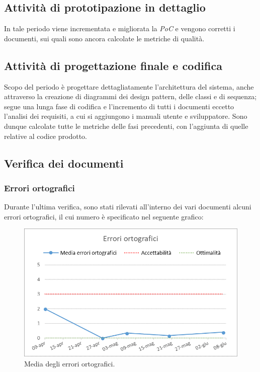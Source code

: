 \subsection{Attività di prototipazione in dettaglio}
In tale periodo viene incrementata e migliorata la \emph{PoC} e vengono corretti i documenti, sui quali sono ancora calcolate le metriche di qualità.

\subsection{Attività di progettazione finale e codifica}
Scopo del periodo è progettare dettagliatamente l'architettura del sistema, anche attraverso la creazione di diagrammi dei design pattern, delle classi e di sequenza; segue una lunga fase di codifica e l'incremento di tutti i documenti eccetto l'analisi dei requisiti, a cui si aggiungono i manuali utente e sviluppatore. Sono dunque calcolate tutte le metriche delle fasi precedenti, con l'aggiunta di quelle relative al codice prodotto.

\subsection{Verifica dei documenti}

\subsubsection{Errori ortografici}
Durante l'ultima verifica, sono stati rilevati all'interno dei vari documenti alcuni errori ortografici, il cui numero è specificato nel seguente grafico:

\begin{figure}[h!]
	\centering
	\includegraphics[scale=0.75]{img/Grafici/Errori_orto.png}
	\caption{Media degli errori ortografici.}
	\label{fig:Errori_orto}
\end{figure}

